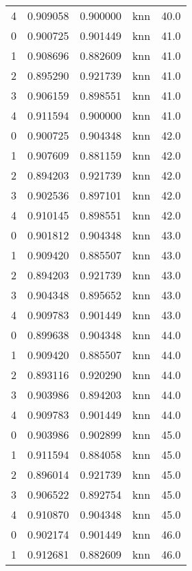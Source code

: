 \begin{tabular}{rrrlr}
     4 & 0.909058 & 0.900000 &      knn &       40.0 \\
     0 & 0.900725 & 0.901449 &      knn &       41.0 \\
     1 & 0.908696 & 0.882609 &      knn &       41.0 \\
     2 & 0.895290 & 0.921739 &      knn &       41.0 \\
     3 & 0.906159 & 0.898551 &      knn &       41.0 \\
     4 & 0.911594 & 0.900000 &      knn &       41.0 \\
     0 & 0.900725 & 0.904348 &      knn &       42.0 \\
     1 & 0.907609 & 0.881159 &      knn &       42.0 \\
     2 & 0.894203 & 0.921739 &      knn &       42.0 \\
     3 & 0.902536 & 0.897101 &      knn &       42.0 \\
     4 & 0.910145 & 0.898551 &      knn &       42.0 \\
     0 & 0.901812 & 0.904348 &      knn &       43.0 \\
     1 & 0.909420 & 0.885507 &      knn &       43.0 \\
     2 & 0.894203 & 0.921739 &      knn &       43.0 \\
     3 & 0.904348 & 0.895652 &      knn &       43.0 \\
     4 & 0.909783 & 0.901449 &      knn &       43.0 \\
     0 & 0.899638 & 0.904348 &      knn &       44.0 \\
     1 & 0.909420 & 0.885507 &      knn &       44.0 \\
     2 & 0.893116 & 0.920290 &      knn &       44.0 \\
     3 & 0.903986 & 0.894203 &      knn &       44.0 \\
     4 & 0.909783 & 0.901449 &      knn &       44.0 \\
     0 & 0.903986 & 0.902899 &      knn &       45.0 \\
     1 & 0.911594 & 0.884058 &      knn &       45.0 \\
     2 & 0.896014 & 0.921739 &      knn &       45.0 \\
     3 & 0.906522 & 0.892754 &      knn &       45.0 \\
     4 & 0.910870 & 0.904348 &      knn &       45.0 \\
     0 & 0.902174 & 0.901449 &      knn &       46.0 \\
     1 & 0.912681 & 0.882609 &      knn &       46.0 \\

\end{tabular}
